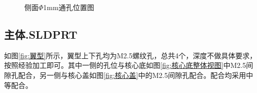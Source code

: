 \documentclass{MyLatex}
\begin{document}
\begin{figure}[H]
\centering
{}
\quad
{}
\caption{侧面$\Phi$1mm通孔位置图} \label{fig:测壁通孔}
\end{figure}




\subsection{主体.SLDPRT}
如图\ref{fig:翼型}所示，翼型上下孔均为M2.5螺纹孔，总共4个，深度不做具体要求，按照经验加工即可。其中一侧的孔位与核心底如图\ref{fig:核心底整体视图}中M2.5间隙孔配合，另一侧与核心盖如图\ref{fig:核心盖}中的M2.5间隙孔配合。配合均采用中等配合。
\end{document}
